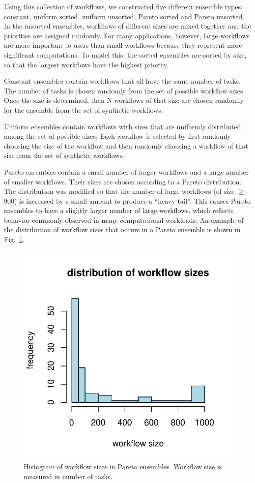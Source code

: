 \documentclass[conference]{IEEEtran}
\begin{document}
Using this collection of workflows, we constructed five different ensemble types:
constant, uniform sorted, uniform unsorted, Pareto sorted and Pareto unsorted.
In the unsorted ensembles, workflows of different sizes are mixed together and
the priorities are assigned randomly.
For many applications, however, large workflows are
more important to users than small workflows because they represent more
significant computations. To model this, the sorted ensembles are sorted by
size, so that the largest workflows have the highest priority.

Constant ensembles contain workflows that all have the same number of tasks. 
The number of tasks is chosen randomly from the set of
possible workflow sizes. Once the size is determined, then N workflows of that
size are chosen randomly for the ensemble from the set of synthetic workflows.

Uniform ensembles contain workflows with sizes that are uniformly distributed
among the set of possible sizes. Each workflow 
is selected by first randomly choosing the size of the workflow
and then randomly choosing a workflow of that size from the set of
synthetic workflows.

Pareto ensembles contain a small number of larger workflows and a large number
of smaller workflows. Their sizes  
are chosen according to a Pareto distribution. The distribution was modified so
that the number of large workflows (of size $\geq$ 900) is increased by a small amount to
produce a ``heavy-tail''. This causes Pareto ensembles to have a slightly larger
number of large workflows, which reflects behavior commonly observed in many
computational workloads. 
An example of the distribution of workflow sizes that
occurs in a Pareto ensemble is shown in Fig.~\ref{fig:ensemble-pareto}.

\begin{figure}[ht] 
    \centering
    \includegraphics[width=0.6\columnwidth]{figures/ensemble-pareto}
    \caption[Histogram of workflow sizes in Pareto ensembles]{Histogram of
    workflow sizes in Pareto ensembles. Workflow size is measured in number of
    tasks.}
    \label{fig:ensemble-pareto}
\end{figure}
\end{document}
